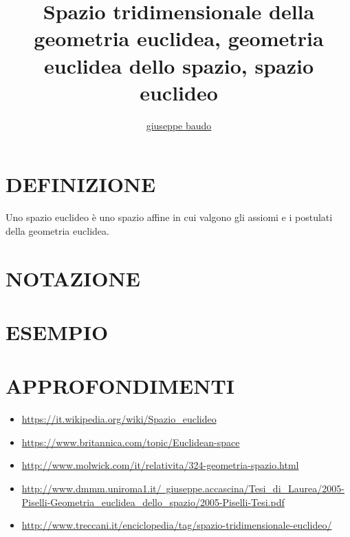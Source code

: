 \documentclass[a4paper,10pt]{article}
\title{Spazio tridimensionale della geometria euclidea, geometria euclidea dello spazio, spazio euclideo}
\author{\href{http://www.baudo.hol.es}{giuseppe baudo}}
\begin{document}
\maketitle

\section{DEFINIZIONE}
Uno spazio euclideo è uno spazio affine in cui valgono gli assiomi e i postulati della geometria euclidea.

\section{NOTAZIONE}

\section{ESEMPIO}

\section{APPROFONDIMENTI}
\begin{itemize}
 \item \href{https://it.wikipedia.org/wiki/Spazio_euclideo}{https://it.wikipedia.org/wiki/Spazio_euclideo}
 \item \href{https://www.britannica.com/topic/Euclidean-space}{https://www.britannica.com/topic/Euclidean-space}
 \item \href{http://www.molwick.com/it/relativita/324-geometria-spazio.html}{http://www.molwick.com/it/relativita/324-geometria-spazio.html}
 \item \href{http://www.dmmm.uniroma1.it/~giuseppe.accascina/Tesi_di_Laurea/2005-Piselli-Geometria_euclidea_dello_spazio/2005-Piselli-Tesi.pdf}{http://www.dmmm.uniroma1.it/~giuseppe.accascina/Tesi_di_Laurea/2005-Piselli-Geometria_euclidea_dello_spazio/2005-Piselli-Tesi.pdf}
 \item \href{http://www.treccani.it/enciclopedia/tag/spazio-tridimensionale-euclideo/}{http://www.treccani.it/enciclopedia/tag/spazio-tridimensionale-euclideo/}
\end{itemize}
\end{document}
